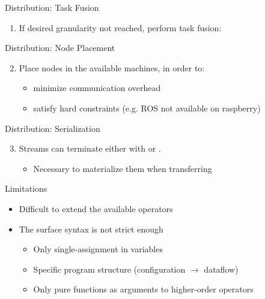 \documentclass{beamer}
\begin{document}
	\begin{frame}{Distribution: Task Fusion}
    \begin{enumerate}
    \item If desired granularity not reached, perform task fusion:
    \end{enumerate}	
   \end{frame}
    
  \begin{frame}{Distribution: Node Placement}
	  \begin{enumerate} \setcounter{enumi}{1}
	  \item Place nodes in the available machines, in order to:
		  \begin{itemize}
		  \item minimize communication overhead
		  \item satisfy hard constraints (e.g. ROS not available on raspberry)
		  \end{itemize}
	  \end{enumerate}
	\end{frame}
	
	\begin{frame}{Distribution: Serialization}
	  \begin{enumerate} \setcounter{enumi}{2}
	  \item Streams can terminate either with  or . 
	    \begin{itemize}
	    \item Necessary to materialize them when transferring
      \end{itemize}
	  \end{enumerate}
	\end{frame}
  
  \begin{frame}{Limitations}
    \begin{itemize}
    \item Difficult to extend the available operators
    \item The surface syntax is not strict enough
      \begin{itemize}
      \item Only single-assignment in  variables
      \item Specific program structure (configuration $\rightarrow$ dataflow)
      \item Only pure functions as arguments to higher-order operators
      \end{itemize}
    \end{itemize}
  \end{frame}
  
\end{document}

